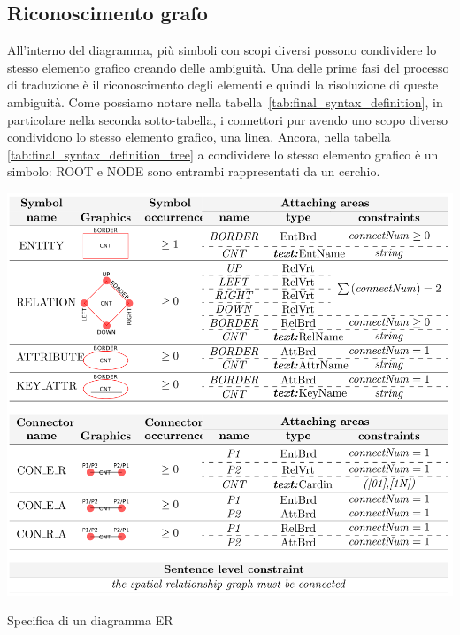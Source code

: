         \subsection{Riconoscimento grafo}
            All'interno del diagramma, più simboli con scopi diversi possono condividere lo stesso elemento grafico creando delle ambiguità. Una delle prime fasi del processo di traduzione è il riconoscimento degli elementi e quindi la risoluzione di queste ambiguità. Come possiamo notare nella tabella~\ref{tab:final_syntax_definition}, in particolare nella seconda sotto-tabella, i connettori pur avendo uno scopo diverso condividono lo stesso elemento grafico, una linea.
            \newline
            Ancora, nella tabella \ref{tab:final_syntax_definition_tree} a condividere lo stesso elemento grafico è un simbolo: ROOT e NODE sono entrambi rappresentati da un cerchio.

            \begin{table}[htbp]
                \centering
                \includegraphics[scale=0.4]{Figure/final_syntax_definition.PNG}
                \caption{Specifica di un diagramma ER \cite{localcontext}}
                \label{tab:final_syntax_definition}
            \end{table}

